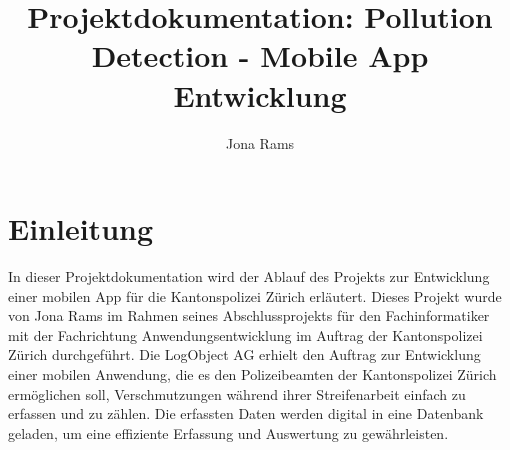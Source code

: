 \documentclass[a4paper,12pt]{article}
\title{Projektdokumentation: Pollution Detection - Mobile App Entwicklung}
\author{Jona Rams}
\begin{document}
\maketitle

\tableofcontents %

\clearpage
\listoffigures
{}

\listoftables
{}

\lstlistoflistings
{}

\clearpage
{}
\printglossary[type=\acronymtype,title=Abkürzungsverzeichnis]


\clearpage
{}
\section{Einleitung}
In dieser Projektdokumentation wird der Ablauf des Projekts zur Entwicklung einer mobilen App für die Kantonspolizei Zürich erläutert. Dieses Projekt wurde von Jona Rams im Rahmen seines Abschlussprojekts für den Fachinformatiker mit der Fachrichtung Anwendungsentwicklung im Auftrag der Kantonspolizei Zürich durchgeführt. Die LogObject AG erhielt den Auftrag zur Entwicklung einer mobilen Anwendung, die es den Polizeibeamten der Kantonspolizei Zürich ermöglichen soll, Verschmutzungen während ihrer Streifenarbeit einfach zu erfassen und zu zählen. Die erfassten Daten werden digital in eine Datenbank geladen, um eine effiziente Erfassung und Auswertung zu gewährleisten.
\end{document}
